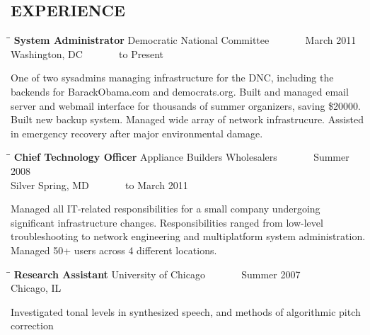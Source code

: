 \documentclass{res}
\begin{document}
\begin{resume}
\section{EXPERIENCE}
   \vspace{-0.1in}	
   \begin{tabbing}
   \hspace{2.3in}\= \hspace{2.6in}\= \kill %
    {\bf System Administrator} \>Democratic National Committee \> ~~~~~~ March 2011 \\
                             \>Washington, DC                    \> ~~~~~~ to Present
   \end{tabbing}\vspace{-20pt}      %
   One of two sysadmins managing infrastructure for the DNC, including the backends for BarackObama.com and democrats.org. Built and managed email server and webmail interface for thousands of summer organizers, saving \$20000. Built new backup system. Managed wide array of network infrastrucure. Assisted in emergency recovery after major environmental damage.
   \begin{tabbing}
   \hspace{2.3in}\= \hspace{2.6in}\= \kill %
    {\bf Chief Technology Officer} \>Appliance Builders Wholesalers \> ~~~~~~ Summer 2008 \\
                             \>Silver Spring, MD                    \> ~~~~~~ to March 2011
   \end{tabbing}\vspace{-20pt}      %
    Managed all IT-related responsibilities for a small company undergoing significant infrastructure changes. Responsibilities ranged from low-level troubleshooting to network engineering and multiplatform system administration. Managed 50+ users across 4 different locations.
   \begin{tabbing}
   \hspace{2.3in}\= \hspace{2.6in}\= \kill %
    {\bf Research Assistant} \>University of Chicago \> ~~~~~~ Summer 2007\\
                          \>Chicago, IL
   \end{tabbing}\vspace{-20pt}
   Investigated tonal levels in synthesized speech, and methods of algorithmic pitch correction

\end{resume}
\end{document}
